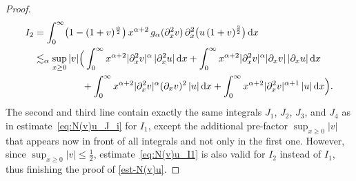 \documentclass[reqno,12pt]{amsart}
\renewcommand{\d}{\ensuremath{\mathrm{d}}}
\renewcommand{\d}{\ensuremath{{\rm d}}}
\numberwithin{equation}{section}
\begin{document}
\begin{proof}
\begin{equation*}
\begin{split}
    I_2
    &=
    \int_0^{\infty} \bigl(1-(1+v)^{\frac{\alpha}{2}}\bigr) \, x^{\alpha+2}\, g_{\alpha}(\partial_x^2 v)\, \partial^2_x\bigl(u\,  (1+v)^{\frac{3}{2}}\bigr) \,\d x
    \\
    &\lesssim_\alpha
    \sup_{x \geq 0} |v|
    \Big(
    \int_0^\infty x^{\alpha+2} |\partial_x^2 v|^\alpha\, |\partial_x^2u|\, \d x 
    + 
    \int_0^\infty x^{\alpha+2} |\partial_x^2 v|^\alpha |\partial_x v|\, |\partial_x u|\, \d x
    \\
    &\phantom{\lesssim_\alpha
    \sup_{x \geq 0} |v| \Big(}
    + \int_0^\infty x^{\alpha+2} |\partial_x^2 v|^\alpha (\partial_x v)^2\, |u|\, \d x
    +
    \int_0^\infty x^{\alpha+2} |\partial_x^2 v|^{\alpha+1}\, |u|\, \d x
    \Big).
\end{split}
\end{equation*}
%
The second and third line contain exactly the same integrals $J_1$, $J_2$, $J_3$, and $J_4$ as in estimate~\eqref{eq:N(v)u_J_i} for $I_1$, except the additional pre-factor $\sup_{x \geq 0} |v|$ that appears now in front of all integrals and not only in the first one. However, since $\sup_{x \ge 0} |v| \le \frac 1 2$, estimate~\eqref{eq:N(v)u_I1} is also valid for $I_2$ instead of $I_1$, thus finishing the proof of \eqref{est-N(v)u}.
\end{proof}
%

%
\end{document}
